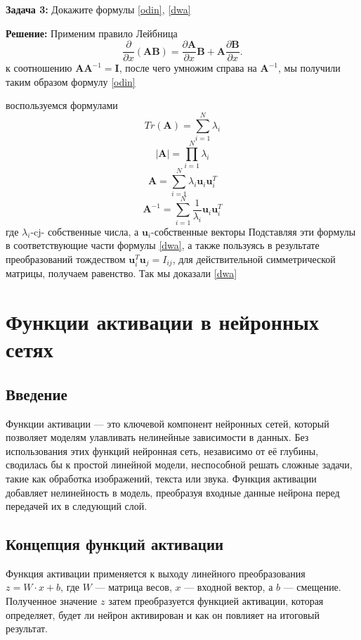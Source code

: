 {\textbf{Задача 3:}
Докажите формулы \ref{odin}, \ref{dwa} \

\textbf{Решение:}
Применим правило Лейбница
\[
\frac{\partial}{\partial x} (\mathbf{AB})=\frac{\partial \mathbf{A}}{\partial x}
 \mathbf{B}+\mathbf{A}\frac{\partial \mathbf{B}}{\partial x}.
\]
к соотношению $\mathbf{AA}^{-1}=\mathbf{I}$, после чего умножим справа на $\mathbf{A}^{-1}$, мы получили таким образом формулу \ref{odin}

воспользуемся формулами 
\[
Tr(\mathbf{A})=\displaystyle \sum_{i=1}^{N} \lambda_i
\]
\[
|\mathbf{A}|=\displaystyle \prod_{i=1}^{N} \lambda_i
\]
\[
\mathbf{A}=\displaystyle \sum_{i=1}^{N} \lambda_i \mathbf{u}_i\mathbf{u}_i^{T}
\]
\[
\mathbf{A}^{-1}=\displaystyle \sum_{i=1}^{N} \frac{1}{\lambda_i} \mathbf{u}_i\mathbf{u}_i^{T}
\]
где $\lambda_i$-cj- собственные числа, а $\mathbf{u}_i$-собственные векторы
Подставляя эти формулы в соответствующие части формулы \ref{dwa}, а также пользуясь в результате преобразований тождеством $\mathbf{u}_i^{T}\mathbf{u}_j=I_{ij}$, для действительной симметрической матрицы, получаем равенство. Так мы доказали \ref{dwa}


\section*{Функции активации в нейронных сетях}

\subsection*{Введение}
Функции активации — это ключевой компонент нейронных сетей, который позволяет моделям улавливать нелинейные зависимости в данных. Без использования этих функций нейронная сеть, независимо от её глубины, сводилась бы к простой линейной модели, неспособной решать сложные задачи, такие как обработка изображений, текста или звука. Функция активации добавляет нелинейность в модель, преобразуя входные данные нейрона перед передачей их в следующий слой.

\subsection*{Концепция функций активации}
Функция активации применяется к выходу линейного преобразования $z = W \cdot x + b$, где $W$ — матрица весов, $x$ — входной вектор, а $b$ — смещение. Полученное значение $z$ затем преобразуется функцией активации, которая определяет, будет ли нейрон активирован и как он повлияет на итоговый результат.

}
